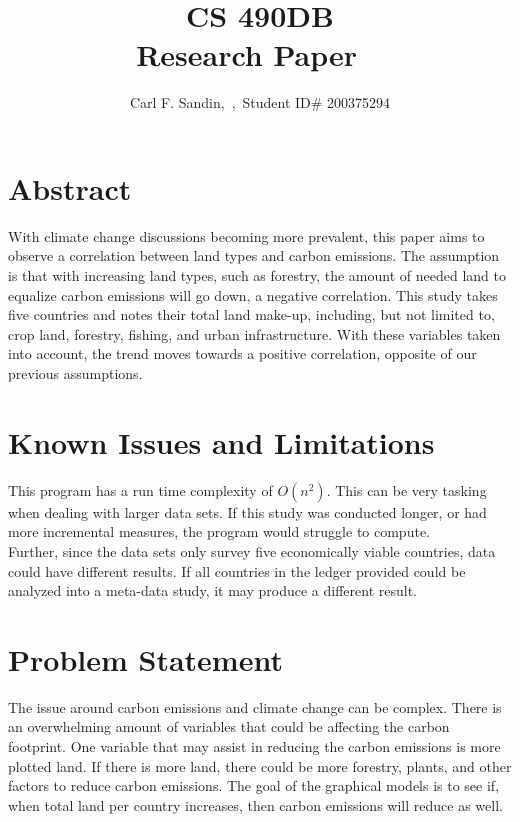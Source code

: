 \documentclass[journal,onecolumn]{IEEEtran}
\begin{document}


\newcommand{\course}{CS 490DB} %
\newcommand{\anum}{} %
\newcommand{\name}{Carl F. Sandin} %
\newcommand{\sid}{200375294} %


\title{\course{} \\ Research Paper \ \anum{}}
\author{\name{},~\IEEEmembership{\course{},~University~of~Regina},~Student ID\# \sid{}}
\maketitle


\section{Abstract}
With climate change discussions becoming more prevalent, this paper aims to observe a correlation between land types and carbon emissions. The assumption is that with increasing land types, such as forestry, the amount of needed land to equalize carbon emissions will go down, a negative correlation. This study takes five countries and notes their total land make-up, including, but not limited to, crop land, forestry, fishing, and urban infrastructure. With these variables taken into account, the trend moves towards a positive correlation, opposite of our previous assumptions.


\section{Known Issues and Limitations}
This program has a run time complexity of $O(n^2)$. This can be very tasking when dealing with larger data sets. If this study was conducted longer, or had more incremental measures, the program would struggle to compute.
\\  Further, since the data sets only survey five economically viable countries, data could have different results. If all countries in the ledger provided could be analyzed into a meta-data study, it may produce a different result.

\section{Problem Statement}
The issue around carbon emissions and climate change can be complex. There is an overwhelming amount of variables that could be affecting the carbon footprint. One variable that may assist in reducing the carbon emissions is more plotted land. If there is more land, there could be more forestry, plants, and other factors to reduce carbon emissions. The goal of the graphical models is to see if, when total land per country increases, then carbon emissions will reduce as well.
 
\end{document}
